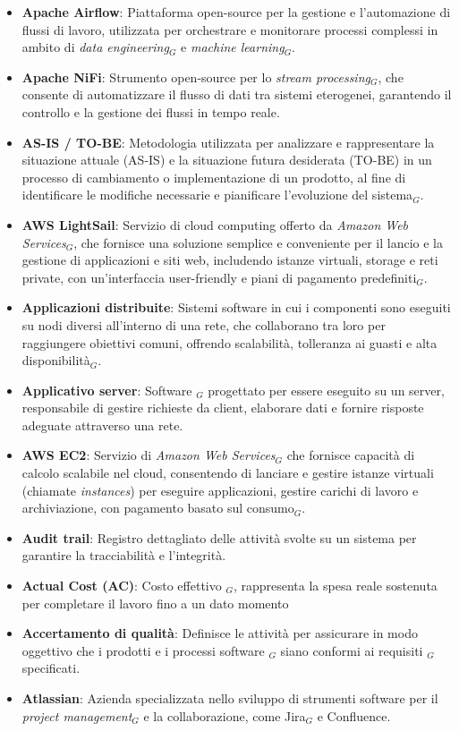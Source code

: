 \begin{itemize}
    \item \textbf{Apache Airflow}: Piattaforma open-source per la gestione e l'automazione di flussi di lavoro, utilizzata per orchestrare e monitorare processi complessi in ambito di \textit{data engineering$_G$} e \textit{machine learning$_G$}.
    \item \textbf{Apache NiFi}: Strumento open-source per lo \textit{stream processing$_G$}, che consente di automatizzare il flusso di dati tra sistemi eterogenei, garantendo il controllo e la gestione dei flussi in tempo reale.
    \item \textbf{AS-IS / TO-BE}: Metodologia utilizzata per analizzare e rappresentare la situazione attuale (AS-IS) e la situazione futura desiderata (TO-BE) in un processo di cambiamento o implementazione di un prodotto, al fine di identificare le modifiche necessarie e pianificare l'evoluzione del sistema$_G$.
    \item \textbf{AWS LightSail}: Servizio di cloud computing offerto da \textit{Amazon Web Services}$_G$, che fornisce una soluzione semplice e conveniente per il lancio e la gestione di applicazioni e siti web, includendo istanze virtuali, storage e reti private, con un'interfaccia user-friendly e piani di pagamento predefiniti$_G$.
    \item \textbf{Applicazioni distribuite}: Sistemi software in cui i componenti sono eseguiti su nodi diversi all'interno di una rete, che collaborano tra loro per raggiungere obiettivi comuni, offrendo scalabilità, tolleranza ai guasti e alta disponibilità$_G$.
    \item \textbf{Applicativo server}: Software $_G$ progettato per essere eseguito su un server, responsabile di gestire richieste da client, elaborare dati e fornire risposte adeguate attraverso una rete.
    \item \textbf{AWS EC2}: Servizio di \textit{Amazon Web Services}$_G$ che fornisce capacità di calcolo scalabile nel cloud, consentendo di lanciare e gestire istanze virtuali (chiamate \textit{instances}) per eseguire applicazioni, gestire carichi di lavoro e archiviazione, con pagamento basato sul consumo$_G$.
    \item \textbf{Audit trail}: Registro dettagliato delle attività svolte su un sistema per garantire la tracciabilità e l’integrità.
    \item \textbf{Actual Cost (AC)}: Costo effettivo $_G$, rappresenta la spesa reale sostenuta per completare il lavoro fino a un dato momento
    \item \textbf{Accertamento di qualità}: Definisce le attività per assicurare in modo oggettivo che i prodotti e i processi software $_G$ siano conformi ai requisiti $_G$ specificati.
    \item \textbf{Atlassian}: Azienda specializzata nello sviluppo di strumenti software per il \textit{project management}$_G$ e la collaborazione, come Jira$_G$ e Confluence.
\end{itemize}
